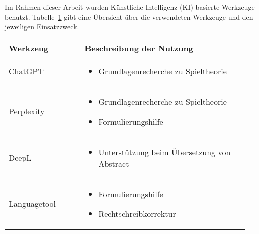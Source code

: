 \setcounter{chapter}{1}

Im Rahmen dieser Arbeit wurden Künstliche Intelligenz (KI) basierte Werkzeuge benutzt. Tabelle~\ref{tab:anhang_uebersicht_KI_werkzeuge} gibt eine Übersicht über die verwendeten Werkzeuge und den jeweiligen Einsatzzweck.

\begin{table}[hbt]	
	\centering
	\renewcommand{\arraystretch}{1.5}	%
	\label{tab:anhang_uebersicht_KI_werkzeuge}
	\begin{tabular}{>{\raggedright\arraybackslash}p{0.3\linewidth} >{\raggedright\arraybackslash}p{0.65\linewidth}}
		\textbf{Werkzeug} & \textbf{Beschreibung der Nutzung}\\
		\hline 
		\hline
		ChatGPT & 	\vspace{-\topsep}
		\begin{itemize}[noitemsep,topsep=0pt,partopsep=0pt,parsep=0pt] 
			\item Grundlagenrecherche zu Spieltheorie 
			
		\end{itemize} \\
		Perplexity &	\vspace{-\topsep}
		\begin{itemize}[noitemsep,topsep=0pt,partopsep=0pt,parsep=0pt] 
			\item Grundlagenrecherche zu Spieltheorie 
			\item Formulierungshilfe
		\end{itemize} \\ 
		DeepL	&	\vspace{-\topsep}
		\begin{itemize}[noitemsep,topsep=0pt,partopsep=0pt,parsep=0pt] 
			\item Unterstützung beim Übersetzung von Abstract
		\end{itemize} \\ 
		Languagetool &	\vspace{-\topsep}
		\begin{itemize}[noitemsep,topsep=0pt,partopsep=0pt,parsep=0pt] 
			\item Formulierungshilfe 
			\item Rechtschreibkorrektur 
		\end{itemize} \\ 
	
	
		\hline 
	\end{tabular} 
\end{table}